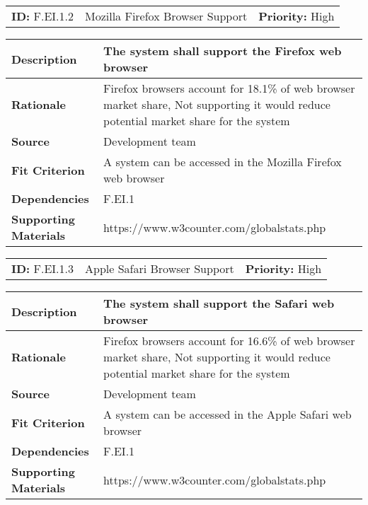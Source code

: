 \begin{table}[H]
    \begin{tabularx}{\textwidth}{| l | X | l |}
        \hline
        \textbf{ID:} F.EI.1.2 & Mozilla Firefox Browser Support & \textbf{Priority:} High \\
    \end{tabularx}
    \begin{tabularx}{\textwidth}{| l | X |}
        \hline
        \textbf{Description} & The system shall support the Firefox web browser \\ \hline
        \textbf{Rationale} & Firefox browsers account for 18.1\% of web browser market share, Not supporting it would reduce potential market share for the system\\ \hline
        \textbf{Source} &  Development team\\ \hline
        \textbf{Fit Criterion} & A system can be accessed in the Mozilla Firefox web browser  \\ \hline
        \textbf{Dependencies} & F.EI.1 \\ \hline
        \textbf{Supporting Materials} & https://www.w3counter.com/globalstats.php \\ \hline
    \end{tabularx}
\end{table}

\begin{table}[H]
    \begin{tabularx}{\textwidth}{| l | X | l |}
        \hline
        \textbf{ID:} F.EI.1.3 & Apple Safari Browser Support & \textbf{Priority:} High \\
    \end{tabularx}
    \begin{tabularx}{\textwidth}{| l | X |}
        \hline
        \textbf{Description} & The system shall support the Safari web browser \\ \hline
        \textbf{Rationale} & Firefox browsers account for 16.6\% of web browser market share, Not supporting it would reduce potential market share for the system\\ \hline
        \textbf{Source} &  Development team\\ \hline
        \textbf{Fit Criterion} & A system can be accessed in the Apple Safari web browser  \\ \hline
        \textbf{Dependencies} & F.EI.1 \\ \hline
        \textbf{Supporting Materials} & https://www.w3counter.com/globalstats.php \\ \hline
    \end{tabularx}
\end{table}

